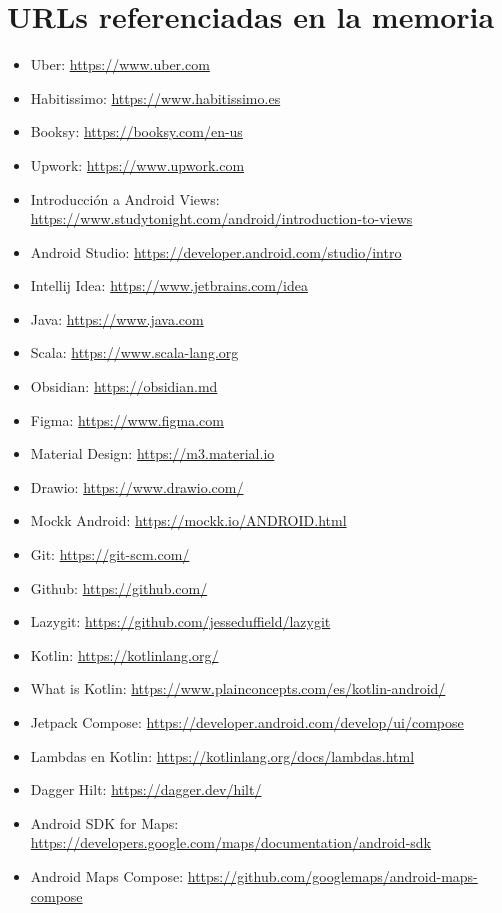 \chapter{URLs referenciadas en la memoria}
\label{Appendix:urls}
\begin{itemize}
  \item Uber: \url{https://www.uber.com}
  \item Habitissimo: \url{https://www.habitissimo.es}
  \item Booksy: \url{https://booksy.com/en-us}
  \item Upwork: \url{https://www.upwork.com}
  \item Introducción a Android Views: \url{https://www.studytonight.com/android/introduction-to-views}
  \item Android Studio: \url{https://developer.android.com/studio/intro}
  \item Intellij Idea: \url{https://www.jetbrains.com/idea}
  \item Java: \url{https://www.java.com}
  \item Scala: \url{https://www.scala-lang.org}
  \item Obsidian: \url{https://obsidian.md}
  \item Figma: \url{https://www.figma.com}
  \item Material Design: \url{https://m3.material.io}
  \item Drawio: \url{https://www.drawio.com/}
  \item Mockk Android: \url{https://mockk.io/ANDROID.html}
  \item Git: \url{https://git-scm.com/}
  \item Github: \url{https://github.com/}
  \item Lazygit: \url{https://github.com/jesseduffield/lazygit}
  \item Kotlin: \url{https://kotlinlang.org/}
  \item What is Kotlin: \url{https://www.plainconcepts.com/es/kotlin-android/}
  \item Jetpack Compose: \url{https://developer.android.com/develop/ui/compose}
  \item Lambdas en Kotlin: \url{https://kotlinlang.org/docs/lambdas.html}
  \item Dagger Hilt: \url{https://dagger.dev/hilt/}
  \item Android SDK for Maps: \url{https://developers.google.com/maps/documentation/android-sdk}
  \item Android Maps Compose: \url{https://github.com/googlemaps/android-maps-compose}

\end{itemize}
